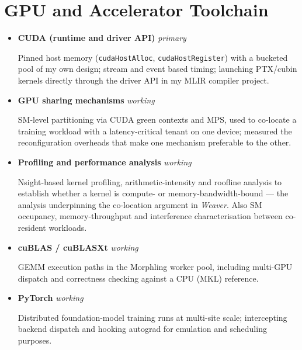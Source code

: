 \documentclass[letterpaper,11pt]{article}
\newcommand{\tool}[3]{%
  \item\small{\textbf{#1} \hfill \textit{\footnotesize #2}\par\vspace{1pt}#3\vspace{2pt}}
}
\begin{document}
\section{GPU and Accelerator Toolchain}
  \begin{itemize}[leftmargin=*]
    \tool{CUDA (runtime and driver API)}{primary}
      {Pinned host memory (\texttt{cudaHostAlloc}, \texttt{cudaHostRegister}) with a bucketed pool of my own design; stream and event based timing; launching PTX/cubin kernels directly through the driver API in my MLIR compiler project.}
    \tool{GPU sharing mechanisms}{working}
      {SM-level partitioning via CUDA green contexts and MPS, used to co-locate a training workload with a latency-critical tenant on one device; measured the reconfiguration overheads that make one mechanism preferable to the other.}
    \tool{Profiling and performance analysis}{working}
      {Nsight-based kernel profiling, arithmetic-intensity and roofline analysis to establish whether a kernel is compute- or memory-bandwidth-bound --- the analysis underpinning the co-location argument in \textit{Weaver}. Also SM occupancy, memory-throughput and interference characterisation between co-resident workloads.}
    \tool{cuBLAS / cuBLASXt}{working}
      {GEMM execution paths in the Morphling worker pool, including multi-GPU dispatch and correctness checking against a CPU (MKL) reference.}
    \tool{PyTorch}{working}
      {Distributed foundation-model training runs at multi-site scale; intercepting backend dispatch and hooking autograd for emulation and scheduling purposes.}
  \end{itemize}

\end{document}
